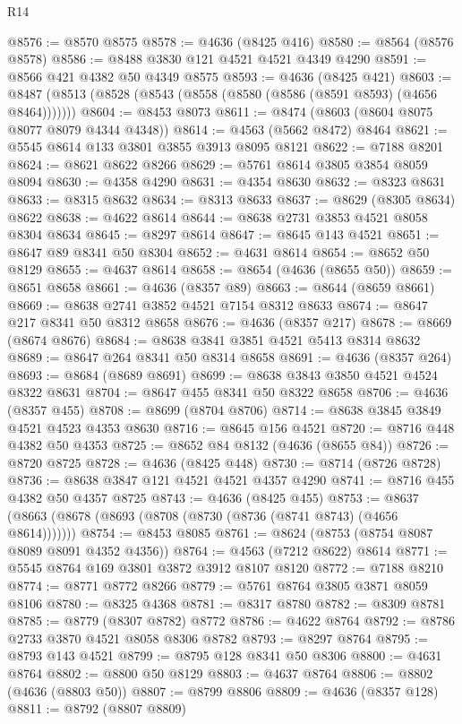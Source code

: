 \begin{lexlean}{R14}
\begin{coremodule}
@8576 := @8570 @8575
@8578 := @4636 (@8425 @416)
@8580 := @8564 (@8576 @8578)
@8586 := @8488 @3830 @121 @4521 @4521 @4349 @4290
@8591 := @8566 @421 @4382 @50 @4349 @8575
@8593 := @4636 (@8425 @421)
@8603 := @8487 (@8513 (@8528 (@8543 (@8558 (@8580 (@8586 (@8591 @8593) (@4656 @8464)))))))
@8604 := @8453 @8073
@8611 := @8474 (@8603 (@8604 @8075 @8077 @8079 @4344 @4348))
@8614 := @4563 (@5662 @8472) @8464
@8621 := @5545 @8614 @133 @3801 @3855 @3913 @8095 @8121
@8622 := @7188 @8201
@8624 := @8621 @8622 @8266
@8629 := @5761 @8614 @3805 @3854 @8059 @8094
@8630 := @4358 @4290
@8631 := @4354 @8630
@8632 := @8323 @8631
@8633 := @8315 @8632
@8634 := @8313 @8633
@8637 := @8629 (@8305 @8634) @8622
@8638 := @4622 @8614
@8644 := @8638 @2731 @3853 @4521 @8058 @8304 @8634
@8645 := @8297 @8614
@8647 := @8645 @143 @4521
@8651 := @8647 @89 @8341 @50 @8304
@8652 := @4631 @8614
@8654 := @8652 @50 @8129
@8655 := @4637 @8614
@8658 := @8654 (@4636 (@8655 @50))
@8659 := @8651 @8658
@8661 := @4636 (@8357 @89)
@8663 := @8644 (@8659 @8661)
@8669 := @8638 @2741 @3852 @4521 @7154 @8312 @8633
@8674 := @8647 @217 @8341 @50 @8312 @8658
@8676 := @4636 (@8357 @217)
@8678 := @8669 (@8674 @8676)
@8684 := @8638 @3841 @3851 @4521 @5413 @8314 @8632
@8689 := @8647 @264 @8341 @50 @8314 @8658
@8691 := @4636 (@8357 @264)
@8693 := @8684 (@8689 @8691)
@8699 := @8638 @3843 @3850 @4521 @4524 @8322 @8631
@8704 := @8647 @455 @8341 @50 @8322 @8658
@8706 := @4636 (@8357 @455)
@8708 := @8699 (@8704 @8706)
@8714 := @8638 @3845 @3849 @4521 @4523 @4353 @8630
@8716 := @8645 @156 @4521
@8720 := @8716 @448 @4382 @50 @4353
@8725 := @8652 @84 @8132 (@4636 (@8655 @84))
@8726 := @8720 @8725
@8728 := @4636 (@8425 @448)
@8730 := @8714 (@8726 @8728)
@8736 := @8638 @3847 @121 @4521 @4521 @4357 @4290
@8741 := @8716 @455 @4382 @50 @4357 @8725
@8743 := @4636 (@8425 @455)
@8753 := @8637 (@8663 (@8678 (@8693 (@8708 (@8730 (@8736 (@8741 @8743) (@4656 @8614)))))))
@8754 := @8453 @8085
@8761 := @8624 (@8753 (@8754 @8087 @8089 @8091 @4352 @4356))
@8764 := @4563 (@7212 @8622) @8614
@8771 := @5545 @8764 @169 @3801 @3872 @3912 @8107 @8120
@8772 := @7188 @8210
@8774 := @8771 @8772 @8266
@8779 := @5761 @8764 @3805 @3871 @8059 @8106
@8780 := @8325 @4368
@8781 := @8317 @8780
@8782 := @8309 @8781
@8785 := @8779 (@8307 @8782) @8772
@8786 := @4622 @8764
@8792 := @8786 @2733 @3870 @4521 @8058 @8306 @8782
@8793 := @8297 @8764
@8795 := @8793 @143 @4521
@8799 := @8795 @128 @8341 @50 @8306
@8800 := @4631 @8764
@8802 := @8800 @50 @8129
@8803 := @4637 @8764
@8806 := @8802 (@4636 (@8803 @50))
@8807 := @8799 @8806
@8809 := @4636 (@8357 @128)
@8811 := @8792 (@8807 @8809)

\end{coremodule}
\end{lexlean}
